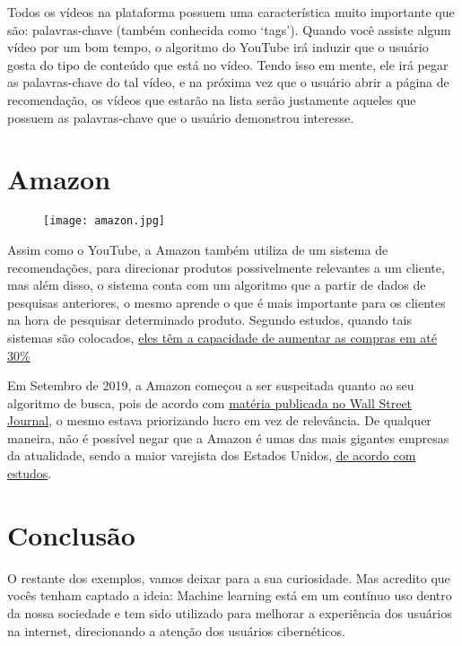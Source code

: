 \documentclass[12pt]{article}
\begin{document}
    Todos os vídeos na plataforma possuem uma característica muito importante
    que são: palavras-chave (também conhecida como ‘tags’). Quando você 
    assiste algum vídeo por um bom tempo, o algoritmo do YouTube irá induzir que 
    o usuário gosta do tipo de conteúdo que está no vídeo. Tendo isso em mente,
    ele irá pegar as palavras-chave do tal vídeo, e na próxima vez que o usuário 
    abrir a página de recomendação, os vídeos que estarão na lista serão 
    justamente aqueles que possuem as palavras-chave que o usuário demonstrou interesse.

    \newpage
    \section{Amazon} \label{sec:amazon}

    \begin{figure}[htp]
        \centering
        \texttt{[image: amazon.jpg]}
    \end{figure}

    Assim como o YouTube, a Amazon também utiliza de um sistema de recomendações, 
    para direcionar produtos possivelmente relevantes a um cliente, mas além 
    disso, o sistema conta com um algoritmo que a partir de dados de pesquisas
    anteriores, o mesmo aprende o que é mais importante para os clientes na 
    hora de pesquisar determinado produto. Segundo estudos, quando tais 
    sistemas são colocados, \href{https://papers.ssrn.com/sol3/papers.cfm?abstract_id=2263983}
    {eles têm a capacidade de aumentar as compras em até 30\%}

    Em Setembro de 2019, a Amazon começou a ser suspeitada quanto ao seu algoritmo
    de busca, pois de acordo com \href{https://www.wsj.com/articles/amazon-changed-search-algorithm-in-ways-that-boost-its-own-products-11568645345}{matéria publicada no Wall Street Journal},
    o mesmo estava priorizando lucro em vez de relevância. De qualquer maneira, não é possível negar
    que a Amazon é umas das mais gigantes empresas da atualidade, sendo a maior
    varejista dos Estados Unidos, \href{https://www.visualcapitalist.com/amazon-worlds-most-valuable-retailer/}{de acordo com estudos}.


    \newpage
    \section{Conclusão}

    O restante dos exemplos, vamos deixar para a sua curiosidade. Mas acredito que 
    vocês tenham captado a ideia: Machine learning está em um contínuo uso dentro da 
    nossa sociedade e tem sido utilizado para melhorar a experiência dos usuários na internet, 
    direcionando a atenção dos usuários cibernéticos.
\end{document}
